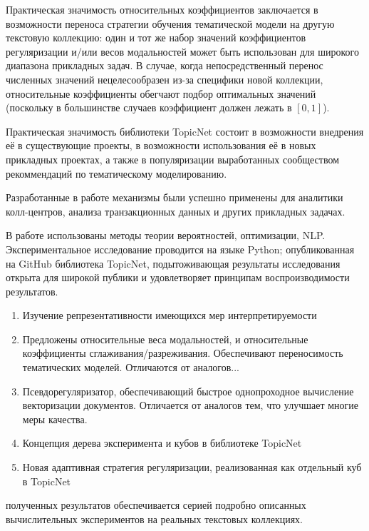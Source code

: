 Практическая значимость относительных коэффициентов заключается в возможности переноса стратегии обучения тематической модели на другую текстовую коллекцию: один и тот же набор значений коэффициентов регуляризации и/или весов модальностей может быть использован для широкого диапазона прикладных задач. В случае, когда непосредственный перенос численных значений нецелесообразен из-за специфики новой коллекции, относительные коэффициенты обегчают подбор оптимальных значений (поскольку в большинстве случаев коэффициент должен лежать в $[0, 1]$).

Практическая значимость библиотеки TopicNet состоит в возможности внедрения её в существующие проекты, в возможности использования её в новых прикладных проектах, а также в популяризации выработанных сообществом рекоммендаций по тематическому моделированию.

Разработанные в работе механизмы были успешно применены для аналитики колл-центров\cite{popov_hier}, анализа транзакционных данных \cite{egorov2019topic} и других прикладных задачах.

{\methods} В работе использованы методы теории вероятностей, оптимизации, NLP. Экспериментальное исследование проводится на языке Python; опубликованная на GitHub библиотека TopicNet, подытоживающая результаты исследования открыта для широкой публики и удовлетворяет принципам воспроизводимости результатов.

{}
\begin{enumerate}[beginpenalty=10000] %
  \item Изучение репрезентативности имеющихся мер интерпретируемости
  \item Предложены относительные веса модальностей, и относительные коэффициенты сглаживания/разреживания. Обеспечивают переносимость тематических моделей. Отличаются от аналогов...
  \item Псевдорегуляризатор, обеспечивающий быстрое однопроходное вычисление векторизации документов. Отличается от аналогов тем, что улучшает многие меры качества.
  \item Концепция дерева эксперимента и кубов в библиотеке TopicNet
  \item Новая адаптивная стратегия регуляризации, реализованная как отдельный куб в TopicNet
\end{enumerate}

{\reliability} полученных результатов обеспечивается серией
подробно описанных вычислительных экспериментов на реальных текстовых
коллекциях. 

